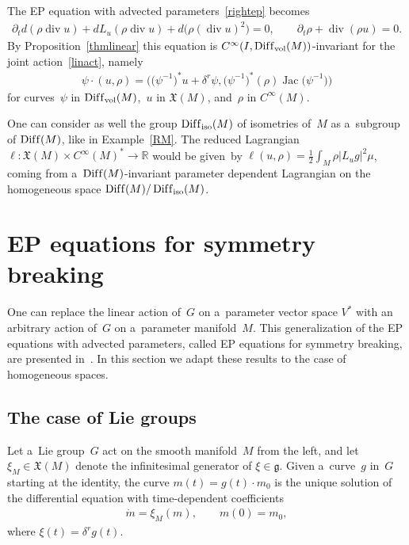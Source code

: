 \documentclass[10pt,a4paper]{amsart}
\numberwithin{equation}{section}
\begin{document}
\begin{Example}
The EP equation with advected parameters~\eqref{rightep} becomes
\begin{gather*}
\partial_t d(\rho\operatorname{div} u)+d L_u (\rho\operatorname{div} u)+ d\big(\rho(\operatorname{div} u)^2\big)=0,
\qquad
\partial_t\rho+\operatorname{div}(\rho u)=0.
\end{gather*}
By Proposition~\ref{thmlinear} this equation   is $C^{\infty}(I,\operatorname{Dif\/f}_{\operatorname{vol}}(M))$-invariant
for the joint action~\eqref{linact}, namely
\begin{gather*}
\psi\cdot(u,\rho)=\big(\big(\psi^{-1}\big)^* u+\delta^r\psi,\big(\psi^{-1}\big)^*(\rho)\operatorname{Jac}\big(\psi^{-1}\big)\big)
\end{gather*}
for curves~$\psi$ in $\operatorname{Dif\/f}_{\operatorname{vol}}(M)$,~$u$ in $\mathfrak X(M)$, and~$\rho$ in
$C^{\infty}(M)$.
\end{Example}

\begin{Example}
One can consider as well the group $\operatorname{Dif\/f}_{\operatorname{iso}}(M)$ of isometries of~$M$ as a~subgroup of
$\operatorname{Dif\/f}(M)$, like in Example~\ref{RM}.
The reduced Lagrangian $\ell:\mathfrak X(M)\times C^{\infty}(M)^*\to\mathbb R$ would be given~by
$\ell(u,\rho)=\frac12\int_M\rho|L_ug|^2\mu$, coming from a~$\operatorname{Dif\/f}(M)$-invariant parameter dependent
Lagrangian on the homogeneous space $\operatorname{Dif\/f}(M)/\operatorname{Dif\/f}_{\operatorname{iso}}(M)$.
\end{Example}

\section{EP equations for symmetry breaking}
\label{s5}

One can replace the linear action of~$G$ on a~parameter vector space $V^*$ with an arbitrary action of~$G$ on
a~parameter manifold~$M$.
This generalization of the EP equations with advected parameters, called EP equations for symmetry breaking, are
presented in~\cite{GBT}.
In this section we adapt these results to the case of homogeneous spaces.

\subsection{The case of Lie groups}

Let a~Lie group~$G$ act on the smooth manifold~$M$ from the left, and let $\xi_M\in\mathfrak X(M)$ denote the
inf\/initesimal generator of $\xi\in\mathfrak g$.
Given a~curve~$g$ in~$G$ starting at the identity, the curve $m(t)=g(t)\cdot m_0$ is the unique solution of the
dif\/ferential equation with time-dependent coef\/f\/icients
\begin{gather*}
\dot{m}=\xi_M(m),
\qquad
m(0)=m_0,
\end{gather*}
where $\xi(t)=\delta^rg(t)$.
\end{document}
